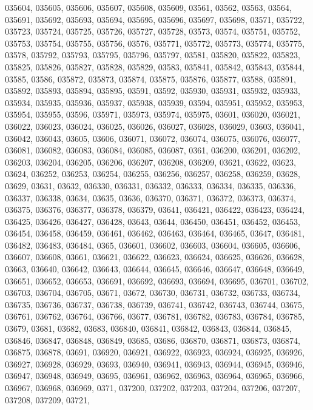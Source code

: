 {035604,
035605,
035606,
035607,
035608,
035609,
03561,
03562,
03563,
03564,
035691,
035692,
035693,
035694,
035695,
035696,
035697,
035698,
03571,
035722,
035723,
035724,
035725,
035726,
035727,
035728,
03573,
03574,
035751,
035752,
035753,
035754,
035755,
035756,
03576,
035771,
035772,
035773,
035774,
035775,
03578,
035792,
035793,
035795,
035796,
035797,
03581,
035820,
035822,
035823,
035825,
035826,
035827,
035828,
035829,
03583,
035841,
035842,
035843,
035844,
03585,
03586,
035872,
035873,
035874,
035875,
035876,
035877,
03588,
035891,
035892,
035893,
035894,
035895,
03591,
03592,
035930,
035931,
035932,
035933,
035934,
035935,
035936,
035937,
035938,
035939,
03594,
035951,
035952,
035953,
035954,
035955,
03596,
035971,
035973,
035974,
035975,
03601,
036020,
036021,
036022,
036023,
036024,
036025,
036026,
036027,
036028,
036029,
03603,
036041,
036042,
036043,
03605,
03606,
036071,
036072,
036074,
036075,
036076,
036077,
036081,
036082,
036083,
036084,
036085,
036087,
0361,
036200,
036201,
036202,
036203,
036204,
036205,
036206,
036207,
036208,
036209,
03621,
03622,
03623,
03624,
036252,
036253,
036254,
036255,
036256,
036257,
036258,
036259,
03628,
03629,
03631,
03632,
036330,
036331,
036332,
036333,
036334,
036335,
036336,
036337,
036338,
03634,
03635,
03636,
036370,
036371,
036372,
036373,
036374,
036375,
036376,
036377,
036378,
036379,
03641,
036421,
036422,
036423,
036424,
036425,
036426,
036427,
036428,
03643,
03644,
036450,
036451,
036452,
036453,
036454,
036458,
036459,
036461,
036462,
036463,
036464,
036465,
03647,
036481,
036482,
036483,
036484,
0365,
036601,
036602,
036603,
036604,
036605,
036606,
036607,
036608,
03661,
036621,
036622,
036623,
036624,
036625,
036626,
036628,
03663,
036640,
036642,
036643,
036644,
036645,
036646,
036647,
036648,
036649,
036651,
036652,
036653,
036691,
036692,
036693,
036694,
036695,
036701,
036702,
036703,
036704,
036705,
03671,
03672,
036730,
036731,
036732,
036733,
036734,
036735,
036736,
036737,
036738,
036739,
036741,
036742,
036743,
036744,
03675,
036761,
036762,
036764,
036766,
03677,
036781,
036782,
036783,
036784,
036785,
03679,
03681,
03682,
03683,
036840,
036841,
036842,
036843,
036844,
036845,
036846,
036847,
036848,
036849,
03685,
03686,
036870,
036871,
036873,
036874,
036875,
036878,
03691,
036920,
036921,
036922,
036923,
036924,
036925,
036926,
036927,
036928,
036929,
03693,
036940,
036941,
036943,
036944,
036945,
036946,
036947,
036948,
036949,
03695,
036961,
036962,
036963,
036964,
036965,
036966,
036967,
036968,
036969,
0371,
037200,
037202,
037203,
037204,
037206,
037207,
037208,
037209,
03721,
}
